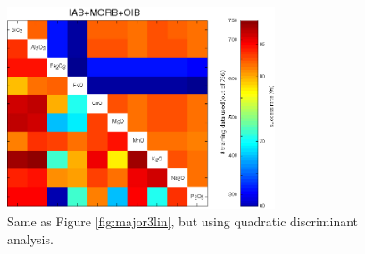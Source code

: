 \begin{figure}[htbp]
  \includegraphics[width=300]{figures/xPlotMajor3Ti_quadratic_err.jpg}
  \caption[Same as  Figure \ref{fig:major3lin}, but  using quadratic discriminant analysis]
{Same as  Figure \ref{fig:major3lin}, but  using quadratic discriminant analysis.}
  \label{fig:major3quad}
\end{figure}

